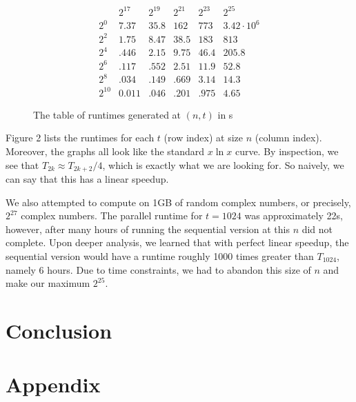 \documentclass[notitlepage, twocolumn]{article}
\begin{document}
\begin{figure}\label{res-table}
	\centering
	\begin{small}
	\[
		\begin{array}{r|c|c|c|c|c}
			& 2^{17} & 2^{19} & 2^{21} & 2^{23} & 2^{25}\\\hline
			2^0& 7.37 & 35.8 & 162 & 773 & 3.42\cdot10^6\\\hline
			2^2& 1.75 & 8.47 & 38.5 & 183  & 813\\\hline
			2^4& .446 & 2.15 & 9.75 & 46.4 & 205.8\\\hline
			2^6& .117 & .552 & 2.51 & 11.9 & 52.8\\\hline
			2^8& .034 & .149 & .669 & 3.14 & 14.3\\\hline
			2^{10}& 0.011 & .046 & .201 & .975 & 4.65
		\end{array}
	\]
	\end{small}
	\caption{The table of runtimes generated at $(n,t)$ in s}
\end{figure}

Figure 2 lists the runtimes for each $t$ (row index) at size $n$ (column index).
Moreover, the graphs all look like the standard $x\ln x$ curve.
By inspection, we see that $T_{2k}\approx T_{2k+2}/4$, which is exactly what we are looking for.
So naively, we can say that this has a linear speedup.

We also attempted to compute on 1GB of random complex numbers, or precisely, $2^{27}$ complex numbers.
The parallel runtime for $t=1024$ was approximately 22s, however, after many hours of running the sequential version at this $n$ did not complete.
Upon deeper analysis, we learned that with perfect linear speedup, the sequential version would have a runtime roughly 1000 times greater than $T_{1024}$, namely 6 hours.
Due to time constraints, we had to abandon this size of $n$ and make our maximum $2^{25}$.

\section{Conclusion}

\section*{Appendix}
\end{document}
